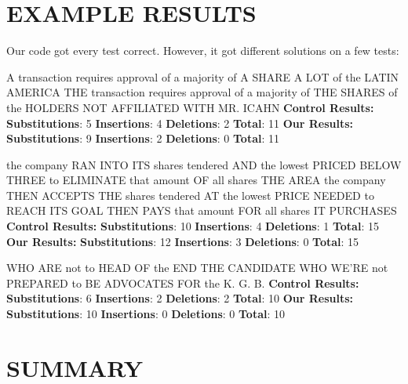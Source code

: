 \documentclass{article}
\begin{document}
\section{\MakeUppercase{Example Results}}
\begin{flushleft}
Our code got every test correct. However, it got different solutions on a few tests:
\break\break

A transaction requires approval of a majority of A SHARE A LOT of the LATIN AMERICA\break
THE transaction requires approval of a majority of THE SHARES of the HOLDERS NOT AFFILIATED WITH MR. ICAHN\break
\textbf{Control Results:}\break
\textbf{Substitutions}: 5 \textbf{Insertions}: 4 \textbf{Deletions}: 2 \textbf{Total}: 11\break
\textbf{Our Results:}\break
\textbf{Substitutions}: 9 \textbf{Insertions}: 2 \textbf{Deletions}: 0 \textbf{Total}: 11\break

the company RAN INTO ITS shares tendered AND the lowest PRICED BELOW THREE to ELIMINATE that amount OF all shares THE AREA\break
the company THEN ACCEPTS THE shares tendered AT the lowest PRICE NEEDED to REACH ITS GOAL THEN PAYS that amount FOR all shares IT PURCHASES\break
\textbf{Control Results:}\break
\textbf{Substitutions}: 10 \textbf{Insertions}: 4 \textbf{Deletions}: 1 \textbf{Total}: 15\break
\textbf{Our Results:}\break
\textbf{Substitutions}: 12 \textbf{Insertions}: 3 \textbf{Deletions}: 0 \textbf{Total}: 15\break

WHO ARE not to HEAD OF the END THE CANDIDATE WHO\break
WE'RE not PREPARED to BE ADVOCATES FOR the K. G. B.\break
\textbf{Control Results:}\break
\textbf{Substitutions}: 6 \textbf{Insertions}: 2 \textbf{Deletions}: 2 \textbf{Total}: 10\break
\textbf{Our Results:}\break
\textbf{Substitutions}: 10 \textbf{Insertions}: 0 \textbf{Deletions}: 0 \textbf{Total}: 10\break



\end{flushleft}

\section{\MakeUppercase{Summary}}
\end{document}
